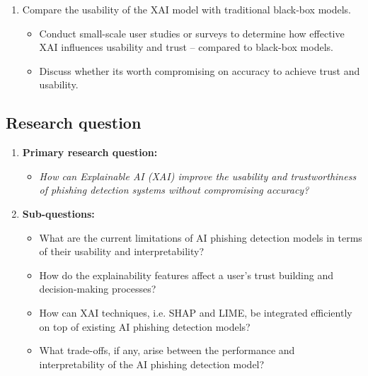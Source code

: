 \begin{enumerate}
\begin{itemize}
        \end{itemize}
    \item Compare the usability of the XAI model with traditional black-box models.
        \begin{itemize}
            \item Conduct small-scale user studies or surveys to determine how effective XAI influences usability and trust -- compared to black-box models.
            \item Discuss whether its worth compromising on accuracy to achieve trust and usability.
        \end{itemize}
\end{enumerate}

\subsection*{Research question}

\begin{enumerate}
    \item \textbf{Primary research question:}
        \begin{itemize}
            \item \textit{How can Explainable AI (XAI) improve the usability and trustworthiness of phishing detection systems without compromising accuracy?}
        \end{itemize}
    \item \textbf{Sub-questions:}
        \begin{itemize}
            \item What are the current limitations of AI phishing detection models in terms of their usability and interpretability?
            \item How do the explainability features affect a user's trust building and decision-making processes?
            \item How can XAI techniques, i.e. SHAP and LIME, be integrated efficiently on top of existing AI phishing detection models?
            \item What trade-offs, if any, arise between the performance and interpretability of the AI phishing detection model?
        \end{itemize}
\end{enumerate}
